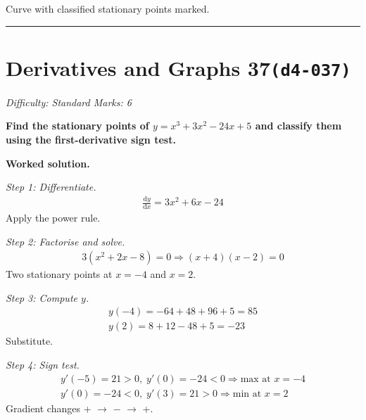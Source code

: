 \documentclass[11pt]{article}
\newcommand{\question}[1]{\par\medskip\noindent\textbf{#1}\par}
\begin{document}
\begin{center}
{
}
\end{center}
\small Curve with classified stationary points marked.\normalsize

\medskip\hrule

\section*{Derivatives and Graphs 37\quad\small\texttt{(d4-037)}}
\textit{Difficulty: Standard \quad\textbar\quad Marks: 6}

\question{Find the stationary points of \( y = x^3 + 3x^2 - 24x + 5 \) and classify them using the first-derivative sign test.}

\textbf{Worked solution.}

\textit{Step 1: Differentiate.}
\[\begin{gathered}
\frac{\mathrm{d}y}{\mathrm{d}x} = 3x^2 + 6x - 24
\end{gathered}\]
Apply the power rule.

\textit{Step 2: Factorise and solve.}
\[\begin{gathered}
3(x^2 + 2x - 8) = 0 \Rightarrow (x+4)(x-2) = 0
\end{gathered}\]
Two stationary points at \( x = -4 \) and \( x = 2 \).

\textit{Step 3: Compute \( y \).}
\[\begin{gathered}
y(-4) = -64 + 48 + 96 + 5 = 85 \\ y(2) = 8 + 12 - 48 + 5 = -23
\end{gathered}\]
Substitute.

\textit{Step 4: Sign test.}
\[\begin{gathered}
y'(-5) = 21 > 0,\; y'(0) = -24 < 0 \Rightarrow \text{max at } x = -4 \\ y'(0) = -24 < 0,\; y'(3) = 21 > 0 \Rightarrow \text{min at } x = 2
\end{gathered}\]
Gradient changes + $\to$ $-$ $\to$ +.
\end{document}
